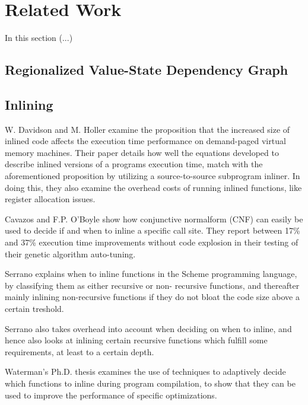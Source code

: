 
\section{Related Work}

In this section (...)

\subsection{Regionalized Value-State Dependency Graph}

\subsection{Inlining}

W. Davidson and M. Holler \cite{SubprogInlining} examine the proposition that
the increased size of inlined code affects the execution time performance on
demand-paged virtual memory machines. Their paper details how well the equations
developed to describe inlined versions of a programs execution time, match with
the aforementioned proposition by utilizing a source-to-source subprogram
inliner. In doing this, they also examine the overhead costs of running inlined
functions, like register allocation issues.

Cavazos and F.P. O'Boyle \cite{AutoTuningJavaHeuristics} show how conjunctive
normalform (CNF) can easily be used to decide if and when to inline a specific
call site. They report between 17\% and 37\% execution time improvements without
code explosion in their testing of their genetic algorithm auto-tuning.

Serrano \cite{InlineWhenHowSerrano} explains when to inline functions in the
Scheme programming language, by classifying them as either recursive or non-
recursive functions, and thereafter mainly inlining non-recursive functions if
they do not bloat the code size above a certain treshold.

Serrano \cite{InlineWhenHowSerrano} also takes overhead into account when
deciding on when to inline, and hence also looks at inlining certain recursive
functions which fulfill some requirements, at least to a certain depth.

Waterman's Ph.D. thesis \cite{AdaptvCompilAndInlingWaterman} examines the use of
techniques to adaptively decide which functions to inline during program
compilation, to show that they can be used to improve the performance of
specific optimizations.

